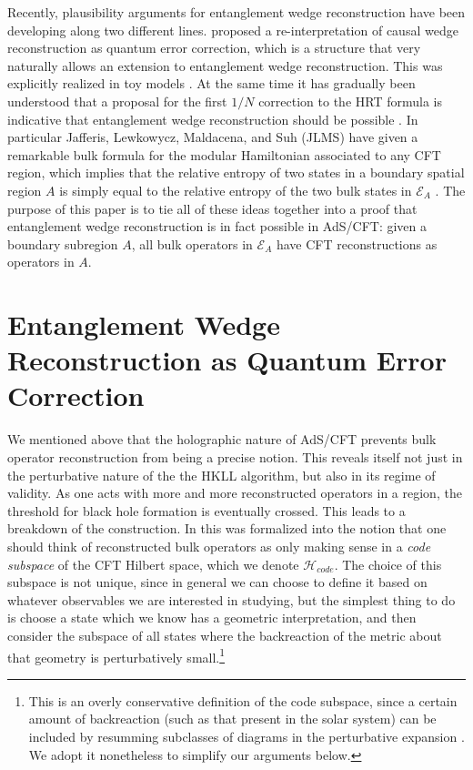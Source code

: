 \documentclass[aps,prl,twocolumn,nofootinbib,longbibliography,superscriptaddress]{revtex4-1}
\newcommand{\EA}{\mathcal{E}_A}
\newcommand{\Hc}{\mathcal{H}_{code}}
\begin{document}
Recently, plausibility arguments for entanglement wedge reconstruction have been developing along two different lines. \cite{Almheiri:2014lwa} proposed a re-interpretation of causal wedge reconstruction as quantum error correction, which is a structure that very naturally allows an extension to entanglement wedge reconstruction.  This was explicitly realized in toy models \cite{Pastawski:2015qua,Hayden:2016cfa}.  At the same time it has gradually been understood that a proposal \cite{Faulkner:2013ana} for the first $1/N$ correction to the HRT formula is indicative that entanglement wedge reconstruction should be possible \cite{Almheiri:2014lwa,Jafferis:2014lza,Jafferis:2015del}.  In particular Jafferis, Lewkowycz, Maldacena, and Suh (JLMS) have given a remarkable bulk formula for the modular Hamiltonian associated to any CFT region, which implies that the relative entropy of two states in a boundary spatial region $A$ is simply equal to the relative entropy of the two bulk states in $\EA$ \cite{Jafferis:2015del}.  The purpose of this paper is to tie all of these ideas together into a proof that entanglement wedge reconstruction is in fact possible in AdS/CFT: given a boundary subregion $A$, all bulk operators in $\EA$ have CFT reconstructions as operators in $A$.

\section{Entanglement Wedge Reconstruction as Quantum Error Correction}
We mentioned above that the holographic nature of AdS/CFT prevents bulk operator reconstruction from being a precise notion.  This reveals itself not just in the perturbative nature of the the HKLL algorithm, but also in its regime of validity.  As one acts with more and more reconstructed operators in a region, the threshold for black hole formation is eventually crossed.  This leads to a breakdown of the construction.  In \cite{Almheiri:2014lwa} this was formalized into the notion that one should think of reconstructed bulk operators as only making sense in a \textit{code subspace} of the CFT Hilbert space, which we denote $\Hc$.  The choice of this subspace is not unique, since in general we can choose to define it based on whatever observables we are interested in studying, but the simplest thing to do is choose a state which we know has a geometric interpretation, and then consider the subspace of all states where the backreaction of the metric about that geometry is perturbatively small.\footnote{This is an overly conservative definition of the code subspace, since a certain amount of backreaction (such as that present in the solar system) can be included by resumming subclasses of diagrams in the perturbative expansion \cite{Heemskerk:2012mn,Marolf:2015dia}.  We adopt it nonetheless to simplify our arguments below.}
\end{document}
